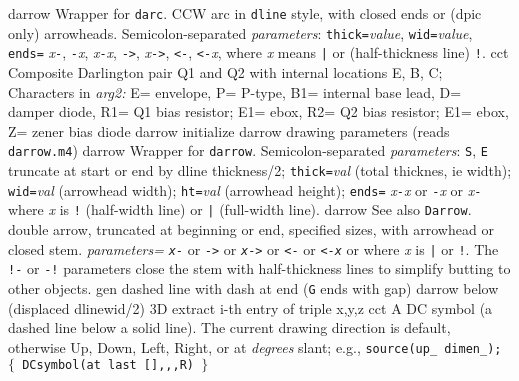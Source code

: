   {darrow}
  {Wrapper for {\tt darc}.
   CCW arc in {\tt dline} style, with closed ends or (dpic only) arrowheads.
  Semicolon-separated {\sl parameters}:
  {\tt thick=}{\sl value}, {\tt wid=}{\sl value}, {\tt ends=}
  {\sl x}{\tt -},
  {\tt -}{\sl x}, {\sl x}{\tt -}{\sl x}, {\tt ->}, {\sl x}{\tt ->},
  {\tt <-}, {\tt <-}{\sl x}, {\tt <->}
  where {\sl x} means {\tt |} or (half-thickness line) {\tt !}.}
  {cct}
  {Composite Darlington pair Q1 and Q2 with internal locations E, B, C;
   Characters in {\sl arg2:}
   E= envelope,
   P= P-type,
   B1= internal base lead,
   D= damper diode,
   R1= Q1 bias resistor; E1= ebox,
   R2= Q2 bias resistor; E1= ebox,
   Z= zener bias diode 
    }
  {darrow}
  {initialize darrow drawing parameters (reads {\tt darrow.m4})}
  {darrow}
  {Wrapper for {\tt darrow}.
  Semicolon-separated {\sl parameters}:
    {\tt S}, {\tt E} truncate at start or end by dline thickness/2;
    {\tt thick=}{\sl val}   (total thicknes, ie width);
    {\tt wid=}{\sl val}     (arrowhead width);
    {\tt ht=}{\sl val}      (arrowhead height);
    {\tt ends=}
      {\sl x}{\tt -}{\sl x} or
      {\tt -}{\sl x} or
      {\sl x}{\tt -} where {\sl x} is {\tt !} (half-width line)
       or {\tt |} (full-width line).}
  {darrow}
  {See also {\tt Darrow}.
   double arrow, truncated at beginning or end, specified sizes,
    with arrowhead or closed stem.
    {\sl parameters=}
    {\tt {\sl x}-} or {\tt ->} or {\tt {\sl x}->} or {\tt <-} or {\tt <-{\sl x}}
    or {\tt <->} where {\sl x} is {\tt |} or {\tt !}.
    The {\tt !-} or {\tt -!} parameters close
    the stem with half-thickness lines to simplify butting to other objects. }
  {gen}
  {dashed line with dash at end ({\tt G} ends with gap)}
  {darrow}
  {below (displaced dlinewid/2)}
  {3D}
  {extract i-th entry of triple x,y,z}
  {cct}
  {A DC symbol (a dashed line below a solid line).
   The current drawing direction is default, otherwise Up, Down,
   Left, Right, or at {\sl degrees} slant; e.g., 
   {\tt source(up\_ dimen\_); $\lbrace$ DCsymbol(at last [],,,R) $\rbrace$}
    }
